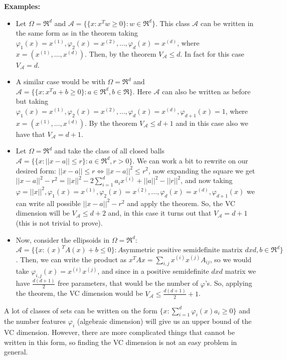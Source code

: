 \documentclass[11pt, english]{article}
\newcommand{\su}[2]{\sum\limits_{#1}^{#2}}
\begin{document}
\textbf{Examples:}
\begin{itemize}
	\item Let $\Omega=\Re^d$ and $\mathcal{A}=\{\{x:x^Tw\geq 0\}:w\in\Re^d\}$. This class $\mathcal{A}$ can be written in the same form as in the theorem taking $\varphi_1(x)=x^{(1)},\varphi_2(x)=x^{(2)},\dots,\varphi_d(x)=x^{(d)}$, where $x=(x^{(1)},\dots,x^{(d)})$. Then, by the theorem $V_{\mathcal{A}}\leq d$. In fact for this case $V_{\mathcal{A}}=d$.
	\item A similar case would be with $\Omega=\Re^d$ and $\mathcal{A}=\{\{x:x^Ta+b\geq 0\}:a\in\Re^d,b\in\Re\}$. Here $\mathcal{A}$ can also be written as before but taking $\varphi_1(x)=x^{(1)},\varphi_2(x)=x^{(2)},\dots,\varphi_d(x)=x^{(d)},\varphi_{d+1}(x)=1$, where $x=(x^{(1)},\dots,x^{(d)})$. By the theorem $V_{\mathcal{A}}\leq d+1$ and in this case also we have that $V_{\mathcal{A}}=d+1$.
	\item Let $\Omega=\Re^d$ and take the class of all closed balls $\mathcal{A}=\{\{x:||x-a||\leq r\}:a\in\Re^d,r>0 \}$. We can work a bit to rewrite on our desired form: $||x-a||\leq r\Leftrightarrow ||x-a||^2\leq r^2$, now expanding the square we get $||x-a||^2-r^2=||x||^2-2\su{i=1}{d}a_ix^{(i)}+||a||^2-||r||^2$, and now taking $\varphi=||x||^2,\varphi_1(x)=x^{(1)},\varphi_2(x)=x^{(2)},\dots,\varphi_d(x)=x^{(d)},\varphi_{d+1}(x)$ we can write all possible $||x-a||^2-r^2$ and apply the theorem. So, the VC dimension will be $V_{\mathcal{A}}\leq d+2$ and, in this case it turns out that $V_{\mathcal{A}}=d+1$ (this is not trivial to prove).
	\item Now, consider the ellipsoids in $\Omega=\Re^d$: $\mathcal{A}=\{\{x:(x)^TA(x)+b\leq 0\}:A\text{symmetric positive semidefinite matrix } dxd,b\in\Re^d\}$. Then, we can write the product as $x^TAx=\su{i,j}{}x^{(i)}x^{(j)}A_{ij}$, so we would take $\varphi_{i,j}(x)=x^{(i)}x^{(j)}$, and since in a positive semidefinite $dxd$ matrix we have $\frac{d(d+1)}{2}$ free parameters, that would be the number of $\varphi$'s. So, applying the theorem, the VC dimension would be $V_{\mathcal{A}}\leq\frac{d(d+1)}{2}+1$.

\end{itemize}
A lot of classes of sets can be written on the form $\{x:\su{i=1}{d}\varphi_i(x)a_i\geq 0\}$ and the number features $\varphi_i$ (algebraic dimension) will give us an upper bound of the VC dimension. However, there are more complicated things that cannot be written in this form, so finding the VC dimension is not an easy problem in general.\\
\end{document}
